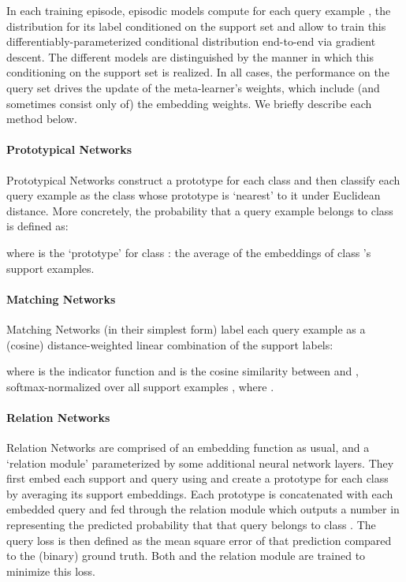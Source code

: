 \documentclass{article} \usepackage{iclr2020_conference,times}
\begin{document}
In each training episode, episodic models compute for each query example
, the distribution for its label  conditioned on the support set  and
allow to train this differentiably-parameterized conditional distribution
end-to-end via gradient descent. The different models are distinguished by the
manner in which this conditioning on the support set is realized. In all cases,
the performance on the query set drives the update of the meta-learner's
weights, which include (and sometimes consist only of) the embedding weights.
We briefly describe each method below.

\paragraph{Prototypical Networks} Prototypical Networks construct a prototype
for each class and then classify each query example as the class whose
prototype is `nearest' to it under Euclidean distance. More concretely, the
probability that a query example  belongs to class  is defined
as:

where  is the `prototype' for class : the average of the
embeddings of class 's support examples.

\paragraph{Matching Networks} Matching Networks (in their simplest form) label
each query example as a (cosine) distance-weighted linear combination of the
support labels:

where  is the indicator function and 
is the cosine similarity between  and
, softmax-normalized over all support examples , where .
\paragraph{Relation Networks}
Relation Networks are comprised of an embedding function  as usual, and a
`relation module' parameterized by some additional neural network layers. They
first embed each support and query using  and create a prototype
 for each class  by averaging its support embeddings. Each prototype
 is concatenated with each embedded query and fed through the
relation module which outputs a number in  representing the predicted
probability that that query belongs to class .  The query loss is then
defined as the mean square error of that prediction compared to the (binary)
ground truth. Both  and the relation module are trained to minimize this
loss.
\end{document}
